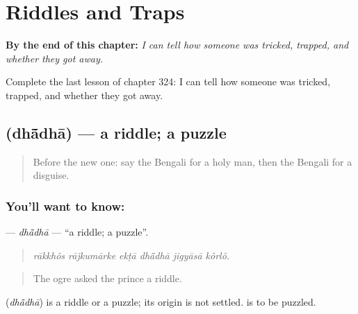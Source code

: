 
\chapter{Riddles and Traps}
\label{ch:bn-riddles-and-traps}

\begin{chapteropening}
\textbf{By the end of this chapter:} \emph{I can tell how someone was tricked, trapped, and whether they got away.}

Complete the last lesson of chapter 324: I can tell how someone was tricked, trapped, and whether they got away.
\end{chapteropening}

\section[\texorpdfstring{\bn{ধাঁধা} (dhā̃dhā)}{ধাঁধা (dhā̃dhā)}]{ (dhā̃dhā) — a riddle; a puzzle}

\label{lesson:BN-C324-dhadha}



\begin{quote}
Before the new one: say the Bengali for a holy man, then the Bengali for a disguise.
\end{quote}

\subsection*{You'll want to know: }
\textbf{} — \emph{dhā̃dhā} — \textquotedblleft{}a riddle; a puzzle\textquotedblright{}.

\begin{quote}
     
\end{quote}

\begin{quote}
\emph{rākkhôs rājkumārke ekṭā dhā̃dhā jigyāsā kôrlô.}
\end{quote}

\begin{quote}
The ogre asked the prince a riddle.
\end{quote}

\begin{cousinweb}
\textbf{} (\emph{dhā̃dhā}) is a riddle or a puzzle; its origin is not settled.   is to be puzzled.
\end{cousinweb}

